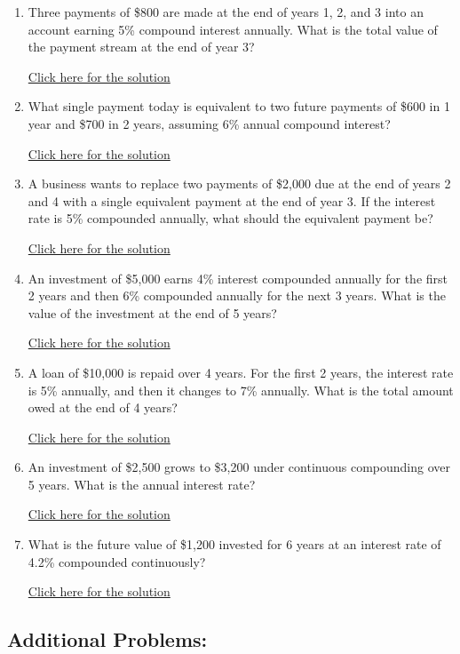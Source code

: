 \documentclass[
]{book}
\providecommand{\tightlist}{%
  \setlength{\itemsep}{0pt}\setlength{\parskip}{0pt}}
\begin{document}
\begin{enumerate}
\def\labelenumi{\arabic{enumi}.}
\tightlist
\item
  Three payments of \$800 are made at the end of years 1, 2, and 3 into an account earning 5\% compound interest annually. What is the total value of the payment stream at the end of year 3?

  \href{https://youtu.be/Tqoxyk1YPeo}{Click here for the solution}
\item
  What single payment today is equivalent to two future payments of \$600 in 1 year and \$700 in 2 years, assuming 6\% annual compound interest?

  \href{https://youtu.be/i35Q8YoohtI}{Click here for the solution}
\item
  A business wants to replace two payments of \$2,000 due at the end of years 2 and 4 with a single equivalent payment at the end of year 3. If the interest rate is 5\% compounded annually, what should the equivalent payment be?

  \href{https://youtu.be/Q_GTSXLL-9c}{Click here for the solution}
\item
  An investment of \$5,000 earns 4\% interest compounded annually for the first 2 years and then 6\% compounded annually for the next 3 years. What is the value of the investment at the end of 5 years?

  \href{https://youtu.be/0_4bwUvlFeg}{Click here for the solution}
\item
  A loan of \$10,000 is repaid over 4 years. For the first 2 years, the interest rate is 5\% annually, and then it changes to 7\% annually. What is the total amount owed at the end of 4 years?

  \href{https://youtu.be/DjsulaiwpTc}{Click here for the solution}
\item
  An investment of \$2,500 grows to \$3,200 under continuous compounding over 5 years. What is the annual interest rate?

  \href{https://youtu.be/evQHobJj7GY}{Click here for the solution}
\item
  What is the future value of \$1,200 invested for 6 years at an interest rate of 4.2\% compounded continuously?

  \href{https://youtu.be/KuNy6RN3H3k}{Click here for the solution}
\end{enumerate}

\subsection*{Additional Problems:}\label{additional-problems-11}
\end{document}
